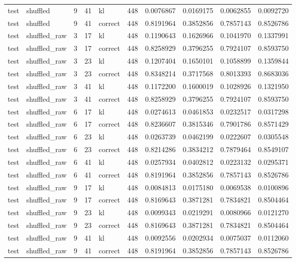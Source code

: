 \begin{tabular}{llrrlrrrrr}
test & shuffled & 9 & 41 & kl & 448 & 0.0076867 & 0.0169175 & 0.0062855 & 0.0092720 \\
test & shuffled & 9 & 41 & correct & 448 & 0.8191964 & 0.3852856 & 0.7857143 & 0.8526786 \\
test & shuffled_raw & 3 & 17 & kl & 448 & 0.1190643 & 0.1626966 & 0.1041970 & 0.1337991 \\
test & shuffled_raw & 3 & 17 & correct & 448 & 0.8258929 & 0.3796255 & 0.7924107 & 0.8593750 \\
test & shuffled_raw & 3 & 23 & kl & 448 & 0.1207404 & 0.1650101 & 0.1058899 & 0.1359844 \\
test & shuffled_raw & 3 & 23 & correct & 448 & 0.8348214 & 0.3717568 & 0.8013393 & 0.8683036 \\
test & shuffled_raw & 3 & 41 & kl & 448 & 0.1172200 & 0.1600019 & 0.1028926 & 0.1321950 \\
test & shuffled_raw & 3 & 41 & correct & 448 & 0.8258929 & 0.3796255 & 0.7924107 & 0.8593750 \\
test & shuffled_raw & 6 & 17 & kl & 448 & 0.0274613 & 0.0461853 & 0.0232517 & 0.0317298 \\
test & shuffled_raw & 6 & 17 & correct & 448 & 0.8236607 & 0.3815346 & 0.7901786 & 0.8571429 \\
test & shuffled_raw & 6 & 23 & kl & 448 & 0.0263739 & 0.0462199 & 0.0222607 & 0.0305548 \\
test & shuffled_raw & 6 & 23 & correct & 448 & 0.8214286 & 0.3834212 & 0.7879464 & 0.8549107 \\
test & shuffled_raw & 6 & 41 & kl & 448 & 0.0257934 & 0.0402812 & 0.0223132 & 0.0295371 \\
test & shuffled_raw & 6 & 41 & correct & 448 & 0.8191964 & 0.3852856 & 0.7857143 & 0.8526786 \\
test & shuffled_raw & 9 & 17 & kl & 448 & 0.0084813 & 0.0175180 & 0.0069538 & 0.0100896 \\
test & shuffled_raw & 9 & 17 & correct & 448 & 0.8169643 & 0.3871281 & 0.7834821 & 0.8504464 \\
test & shuffled_raw & 9 & 23 & kl & 448 & 0.0099343 & 0.0219291 & 0.0080966 & 0.0121270 \\
test & shuffled_raw & 9 & 23 & correct & 448 & 0.8169643 & 0.3871281 & 0.7834821 & 0.8504464 \\
test & shuffled_raw & 9 & 41 & kl & 448 & 0.0092556 & 0.0202934 & 0.0075037 & 0.0112060 \\
test & shuffled_raw & 9 & 41 & correct & 448 & 0.8191964 & 0.3852856 & 0.7857143 & 0.8526786 \\
\bottomrule
\end{tabular}
